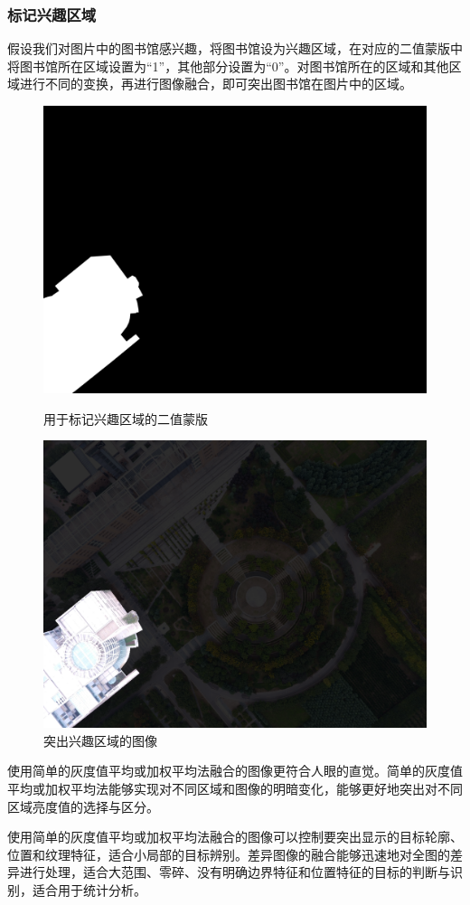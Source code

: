 \subsubsection{标记兴趣区域}
假设我们对图片中的图书馆感兴趣，将图书馆设为兴趣区域，在对应的二值蒙版中将图书馆所在区域设置为“1”，其他部分设置为“0”。对图书馆所在的区域和其他区域进行不同的变换，再进行图像融合，即可突出图书馆在图片中的区域。
\begin{figure}[H]
	\centering
	\begin{minipage}{0.45\linewidth}
		\includegraphics[width=\linewidth]{figure/DJI_0027_Compressed_Mask.png}
		\caption{用于标记兴趣区域的二值蒙版}
	\end{minipage}
	\begin{minipage}{0.45\linewidth}
		\includegraphics[width=\linewidth]{figure/DJI_0027_Interest.png}
		\caption{突出兴趣区域的图像}
	\end{minipage}
\end{figure}
使用简单的灰度值平均或加权平均法融合的图像更符合人眼的直觉。简单的灰度值平均或加权平均法能够实现对不同区域和图像的明暗变化，能够更好地突出对不同区域亮度值的选择与区分。

使用简单的灰度值平均或加权平均法融合的图像可以控制要突出显示的目标轮廓、位置和纹理特征，适合小局部的目标辨别。差异图像的融合能够迅速地对全图的差异进行处理，适合大范围、零碎、没有明确边界特征和位置特征的目标的判断与识别，适合用于统计分析。